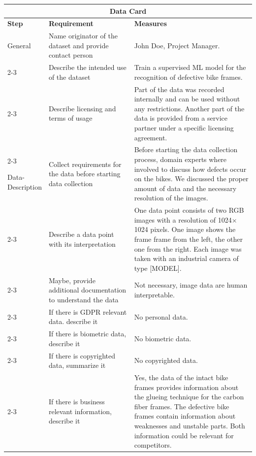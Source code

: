 \newpage
{\small
\begin{longtable}{p{0.15\linewidth}|p{0.35\linewidth}p{0.5\linewidth}}  
    \toprule
    \multicolumn{3}{c}{\bf{Data Card}}\\
    \toprule
        
    \bf{Step}            & \bf{Requirement}                                & \bf{Measures} \\
    \hline
    \hline
    
    General        
        & Name originator of the dataset and provide contact person            & John Doe, Project Manager.  \\\cline{2-3}               
        & Describe the intended use of the dataset                     & Train a supervised ML model for the recognition of defective bike frames.   \\\cline{2-3}              
        & Describe licensing and terms of usage                     & Part of the data was recorded internally and can be used without any restrictions. Another part of the data is provided from a service partner under a specific licensing agreement. \\\cline{2-3}             
    
    \hline
    Data-Description  
        & Collect requirements for the data before starting data collection & Before starting the data collection process, domain experts where involved to discuss how defects occur on the bikes. We discussed the proper amount of data and the necessary resolution of the images.\\\cline{2-3}
        & Describe a data point with its interpretation             & One data point consists of two RGB images with a  resolution of 1024$\times$1024 pixels. One image shows the frame frame from the left, the other one from the right. Each image was taken with an industrial camera of type [MODEL].  \\\cline{2-3} 
        & Maybe, provide additional documentation to understand the data & Not necessary, image data are human interpretable.        \\\cline{2-3}
        & If there is GDPR relevant data. describe it  & No personal data.               \\\cline{2-3}
        & If there is biometric data, describe it                   &   No biometric data.               \\\cline{2-3}
        & If there is copyrighted data, summarize it                &   No copyrighted data.               \\\cline{2-3}
        & If there is business relevant information, describe it          & Yes, the data of the intact bike frames provides information about the glueing technique for the carbon fiber frames. The defective bike frames contain information about weaknesses and unstable parts. Both information could be relevant for competitors.        \\
       

\end{longtable}}
